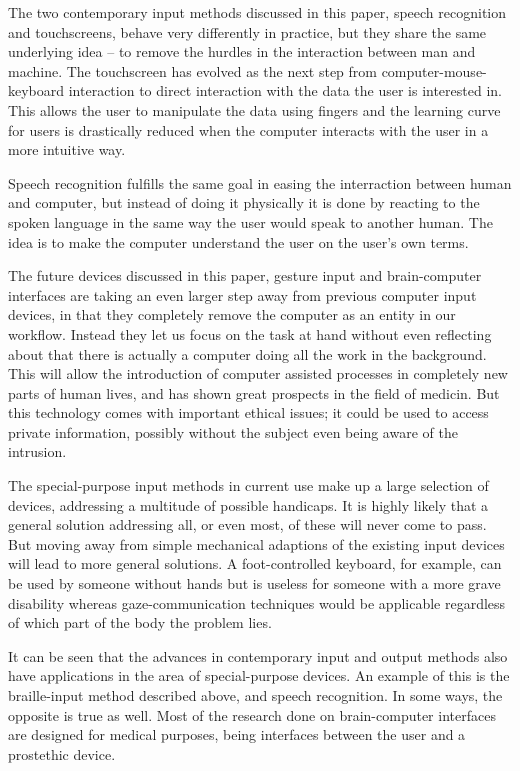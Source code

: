 
The two contemporary input methods discussed in this paper, speech recognition and touchscreens, behave very differently in practice, but they share the same underlying idea -- to remove the hurdles in the interaction between man and machine. The touchscreen has evolved as the next step from computer-mouse-keyboard interaction to direct interaction with the data the user is interested in. This allows the user to manipulate the data using fingers and the learning curve for users is drastically reduced when the computer interacts with the user in a more intuitive way.

Speech recognition fulfills the same goal in easing the interraction between human and computer, but instead of doing it physically it is done by reacting to the spoken language in the same way the user would speak to another human. The idea is to make the computer understand the user on the user's own terms.


The future devices discussed in this paper, gesture input and brain-computer interfaces are taking an even larger step away from previous computer input devices, in that they completely remove the computer as an entity in our workflow. Instead they let us focus on the task at hand without even reflecting about that there is actually a computer doing all the work in the background. This will allow the introduction of computer assisted processes in completely new parts of human lives, and has shown great prospects in the field of medicin. But this technology comes with important ethical issues; it could be used to access private information, possibly without the subject even being aware of the intrusion.

The special-purpose input methods in current use make up a large selection of devices, addressing a multitude of possible handicaps. It is highly likely that a general solution addressing all, or even most, of these will never come to pass. But moving away from simple mechanical adaptions of the existing input devices will lead to more general solutions. A foot-controlled keyboard, for example, can be used by someone without hands but is useless for someone with a more grave disability whereas gaze-communication techniques would be applicable regardless of which part of the body the problem lies.

It can be seen that the advances in contemporary input and output methods also have applications in the area of special-purpose devices. An example of this is the braille-input method described above, and speech recognition. In some ways, the opposite is true as well. Most of the research done on brain-computer interfaces are designed for medical purposes, being interfaces between the user and a prostethic device.


